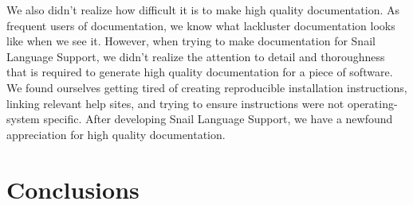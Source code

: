 \documentclass{article}
\begin{document}
We also didn't realize how difficult it is to make high quality documentation. As frequent users of documentation, we know what lackluster documentation looks like when we see it. However, when trying to make documentation for Snail Language Support, we didn't realize the attention to detail and thoroughness that is required to generate high quality documentation for a piece of software. We found ourselves getting tired of creating reproducible installation instructions, linking relevant help sites, and trying to ensure instructions were not operating-system specific. After developing Snail Language Support, we have a newfound appreciation for high quality documentation. 

\section{Conclusions}

\newpage




\newpage
\end{document}
